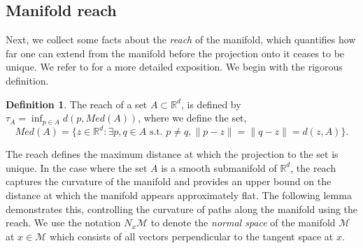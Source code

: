 \documentclass[10pt]{article}
\theoremstyle{plain}
\theoremstyle{definition}
\newtheorem{definition}[theorem]{Definition}
\theoremstyle{remark}
\newcommand{\M}{{\mathcal{M}}}
\newcommand{\R}{\mathbb{R}}
\begin{document}
\subsection{Manifold reach}\label{app:reach}
Next, we collect some facts about the \textit{reach} of the manifold, which quantifies how far one can extend from the manifold before the projection onto it ceases to be unique. We refer to \citep{Aamari2017-he} for a more detailed exposition. We begin with the rigorous definition.
\begin{definition}
The reach of a set \(A \subset \R^d\), is defined by \(\tau_A = \inf_{p \in A} d(p, Med(A))\), where we define the set,
\begin{equation*}
    Med(A) = \Big \{z \in \R^d: \exists p, q \in A \text{ s.t. } p \neq q, \|p - z\| = \|q - z\| = d(z, A) \Big \}.
\end{equation*}
\end{definition}

The reach defines the maximum distance at which the projection to the set is unique. In the case where the set \(A\) is a smooth submanifold of \(\R^d\), the reach captures the curvature of the manifold and provides an upper bound on the distance at which the manifold appears approximately flat. The following lemma demonstrates this, controlling the curvature of paths along the manifold using the reach. We use the notation \(N_x \M\) to denote the \textit{normal space} of the manifold \(\M\) at \(x \in \M\) which consists of all vectors perpendicular to the tangent space at \(x\).
\end{document}
